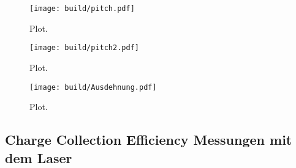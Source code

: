 \begin{figure}
  \centering
  \texttt{[image: build/pitch.pdf]}
  \caption{Plot.}
  \label{fig:pitch}
\end{figure}

\begin{figure}
  \centering
  \texttt{[image: build/pitch2.pdf]}
  \caption{Plot.}
  \label{fig:pitch2}
\end{figure}

\begin{figure}
  \centering
  \texttt{[image: build/Ausdehnung.pdf]}
  \caption{Plot.}
  \label{fig:Ausdehnung}
\end{figure}

\subsection{Charge Collection Efficiency Messungen mit dem Laser}

